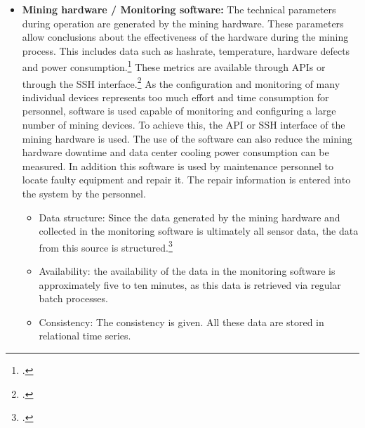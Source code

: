 \begin{itemize}

    \item \textbf{Mining hardware / Monitoring software: }
    The technical parameters during operation are generated by the mining hardware. These parameters allow
    conclusions about the effectiveness of the hardware during the mining process. This includes data such as hashrate, temperature,
    hardware defects and power consumption.\footcite[Cf.][p. 12]{antminer2021manual} These metrics are available through \acp{API} or
    through the \ac{SSH} interface.\footcite[Cf.][]{awesomeminer2021api} As the configuration and monitoring of many individual
    devices represents too much effort and time consumption for personnel, software is used
    capable of monitoring and configuring a large number of mining devices. To achieve this,
    the \ac{API} or \ac{SSH} interface of the mining hardware is used. The use of the software can also reduce the
    mining hardware downtime and data center cooling power consumption can be measured. In addition
    this software is used by maintenance personnel to locate faulty equipment and repair it.
    The repair information is entered into the system by the personnel.
    \begin{itemize}
        \item Data structure: Since the data generated by the mining hardware and collected in the monitoring software is ultimately
        all sensor data, the data from this source is structured.\footcite[Cf.][p. 27]{kimble2015big}
        \item Availability: the availability of the data in the monitoring software is approximately five to ten minutes,
        as this data is retrieved via regular batch processes.
        \item Consistency: The consistency is given. All these data are stored in relational time series. 
    \end{itemize}


\end{itemize}

